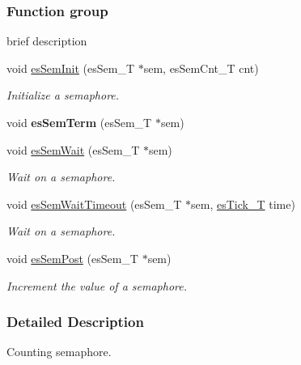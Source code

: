 \subsubsection*{Function group}
\label{_amgrpec1f4104dc63801ceee35db9d6f5502d}%
brief description \begin{DoxyCompactItemize}
\item 
void \hyperlink{group__sem__intf_gae4481945af3c671b99e87b151de98085}{es\-Sem\-Init} (es\-Sem\-\_\-\-T $\ast$sem, es\-Sem\-Cnt\-\_\-\-T cnt)
\begin{DoxyCompactList}\small\item\em Initialize a semaphore. \end{DoxyCompactList}\item 
\hypertarget{group__sem__intf_ga897ad9e48bcf3fea3fa68897cbcf33d9}{void {\bfseries es\-Sem\-Term} (es\-Sem\-\_\-\-T $\ast$sem)}\label{group__sem__intf_ga897ad9e48bcf3fea3fa68897cbcf33d9}

\item 
void \hyperlink{group__sem__intf_gaf742af1a3888b602a45e4cd394f28550}{es\-Sem\-Wait} (es\-Sem\-\_\-\-T $\ast$sem)
\begin{DoxyCompactList}\small\item\em Wait on a semaphore. \end{DoxyCompactList}\item 
void \hyperlink{group__sem__intf_ga4f11d79edca489a754f9385ca7c89b36}{es\-Sem\-Wait\-Timeout} (es\-Sem\-\_\-\-T $\ast$sem, \hyperlink{group__kern__vtmr_ga844873888c186ee81eb66620dadb0451}{es\-Tick\-\_\-\-T} time)
\begin{DoxyCompactList}\small\item\em Wait on a semaphore. \end{DoxyCompactList}\item 
void \hyperlink{group__sem__intf_ga372df852afd413b4fe2e65591da2fe79}{es\-Sem\-Post} (es\-Sem\-\_\-\-T $\ast$sem)
\begin{DoxyCompactList}\small\item\em Increment the value of a semaphore. \end{DoxyCompactList}\end{DoxyCompactItemize}


\subsubsection{Detailed Description}
Counting semaphore. 


